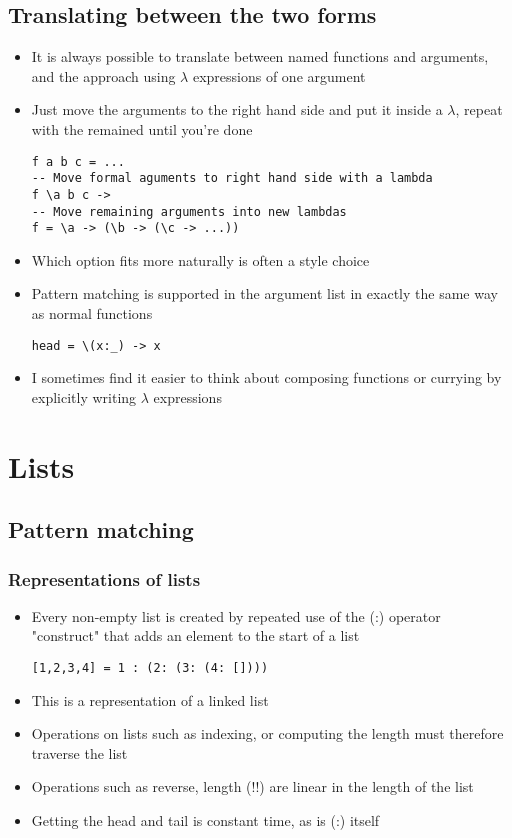 \documentclass{article}[18pt]
\begin{document}
\subsection{Translating between the two forms}
\begin{itemize}
	\item It is always possible to translate between named functions and arguments, and the approach using $\lambda$ expressions of one argument
	\item Just move the arguments to the right hand side and put it inside a $\lambda$, repeat with the remained until you're done
\begin{verbatim}
f a b c = ...
-- Move formal aguments to right hand side with a lambda
f \a b c ->
-- Move remaining arguments into new lambdas
f = \a -> (\b -> (\c -> ...))
\end{verbatim}
	\item Which option fits more naturally is often a style choice
	\item Pattern matching is supported in the argument list in exactly the same way as normal functions
\begin{verbatim}
head = \(x:_) -> x
\end{verbatim}
	\item I sometimes find it easier to think about composing functions or currying by explicitly writing $\lambda$ expressions
\end{itemize}
\section{Lists}
\subsection{Pattern matching}
\subsubsection{Representations of lists}
\begin{itemize}
	\item Every non-empty list is created by repeated use of the (:) operator "construct" that adds an element to the start of a list
\begin{verbatim}
[1,2,3,4] = 1 : (2: (3: (4: [])))
\end{verbatim}
	\item This is a representation of a linked list
	\item Operations on lists such as indexing, or computing the length must therefore traverse the list
	\item Operations such as reverse, length (!!) are linear in the length of the list
	\item Getting the head and tail is constant time, as is (:) itself
\end{itemize}
\end{document}
